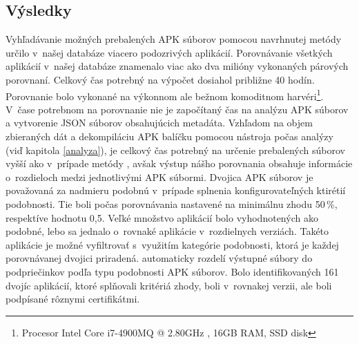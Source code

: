 \subsection{Výsledky}
Vyhľadávanie možných prebalených APK súborov pomocou navrhnutej metódy určilo v~našej databáze viacero podozrivých aplikácií. Porovnávanie všetkých aplikácií v~našej databáze znamenalo viac ako dva milióny vykonaných párových porovnaní. Celkový čas potrebný na výpočet dosiahol približne 40 hodín. Porovnanie bolo vykonané na výkonnom ale bežnom komoditnom harvéri\footnote{Procesor Intel Core i7-4900MQ @ 2.80GHz , 16GB RAM, SSD disk}. V~čase potrebnom na porovnanie nie je započítaný čas na analýzu APK súborov a vytvorenie JSON súborov obsahujúcich metadáta. Vzhľadom na objem zbieraných dát a dekompiláciu APK balíčku pomocou nástroja  počas analýzy (viď kapitola \ref{analyza}), je celkový čas potrebný na určenie prebalených súborov vyšší ako v~prípade metódy , avšak výstup nášho porovnania obsahuje informácie o~rozdieloch medzi jednotlivými APK súbormi. Dvojica APK súborov je považovaná za nadmieru podobnú v~prípade splnenia konfigurovateľných ktirétií podobnosti. Tie boli počas porovnávania nastavené na minimálnu zhodu 50\,\%, respektíve hodnotu  0,5. Veľké množstvo aplikácií bolo vyhodnotených ako podobné, lebo sa jednalo o~rovnaké aplikácie v~rozdielnych verziách. Takéto aplikácie je možné vyfiltrovať s~využitím kategórie podobnosti, ktorá je každej porovnávanej dvojici priradená.  automaticky rozdelí výstupné súbory do podpriečinkov podľa typu podobnosti APK súborov. Bolo identifikovaných 161 dvojíc aplikácií, ktoré splňovali kritériá zhody, boli v~rovnakej verzii, ale boli podpísané rôznymi certifikátmi.